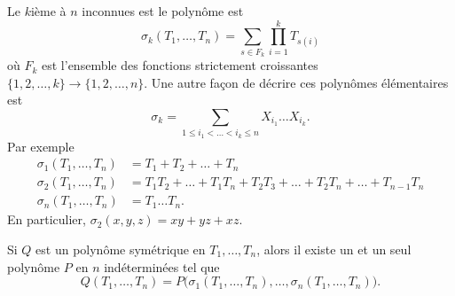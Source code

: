 Le \( k\)ième  à \( n\) inconnues est le polynôme est
\begin{equation}
    \sigma_k(T_1,\ldots, T_n)=\sum_{s\in F_k}\prod_{i=1}^kT_{s(i)}
\end{equation}
où \( F_k\) est l'ensemble des fonctions strictement croissantes \( \{ 1,2,\ldots, k \}\to\{ 1,2,\ldots, n \}\). Une autre façon de décrire ces polynômes élémentaires est
\begin{equation}
    \sigma_k=\sum_{1\leq i_1<\ldots<i_k\leq n}X_{i_1}\ldots X_{i_k}.
\end{equation}
Par exemple
\begin{subequations}
    \begin{align}
        \sigma_1(T_1,\ldots, T_n)&=T_1+T_2+\ldots +T_n\\
        \sigma_2(T_1,\ldots, T_n)&=T_1T_2+\ldots +T_1T_n+T_2T_3+\ldots +T_2T_n+\ldots +T_{n-1}T_n\\
        \sigma_n(T_1,\ldots, T_n)&=T_1\ldots T_n.
    \end{align}
\end{subequations}
En particulier, \( \sigma_2(x,y,z)=xy+yz+xz\).

\begin{theorem}  \label{TholReBiw}
    Si \( Q\) est un polynôme symétrique en \( T_1,\ldots, T_n\), alors il existe un et un seul polynôme \( P\) en \( n\) indéterminées tel que
    \begin{equation}
        Q(T_1,\ldots, T_n)=P\big( \sigma_1(T_1,\ldots, T_n),\ldots, \sigma_n(T_1,\ldots, T_n) \big).
    \end{equation}
\end{theorem}

